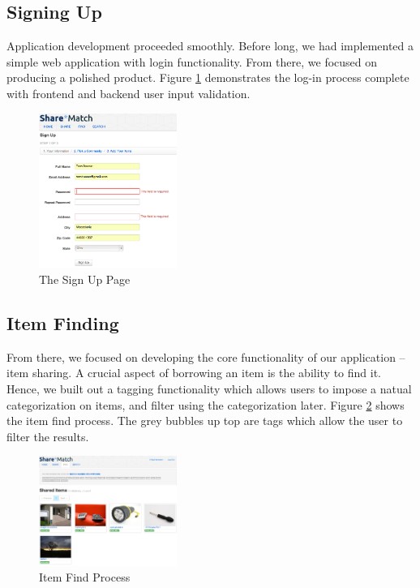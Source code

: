\documentclass{acm_proc_article-sp}
\begin{document}
\subsection{Signing Up}
Application development proceeded smoothly. Before long, we had implemented a simple web application with login functionality.
From there, we focused on producing a polished product. Figure \ref{fig:SignUpPage.png} demonstrates the log-in process
complete with frontend and backend user input validation.
\begin{figure}[h]
\begin{centering}
\includegraphics[width=0.4\textwidth]{SignUpPage.png} %
\caption{The Sign Up Page}
\label{fig:SignUpPage.png}
\end{centering}
\end{figure}

\subsection{Item Finding}
From there, we focused on developing the core functionality of our application -- item sharing. A crucial aspect of borrowing
an item is the ability to find it. Hence, we built out a tagging functionality which allows users to impose a natual
categorization on items, and filter using the categorization later. Figure \ref{fig:ItemSearch.png} shows the item find
process. The grey bubbles up top are tags which allow the user to filter the results.
\begin{figure}[h]
\begin{centering}
\includegraphics[width=0.4\textwidth]{ItemSearch.png}
\caption{Item Find Process}
\label{fig:ItemSearch.png}
\end{centering}
\end{figure}
\end{document}
